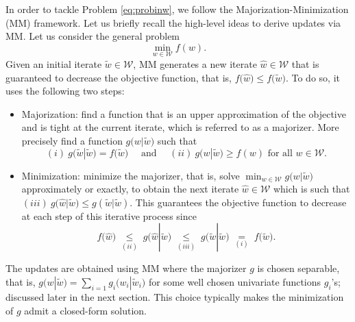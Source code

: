 \documentclass[a4paper, 11pt]{article}
\begin{document}
In order to tackle Problem \eqref{eq:probinw}, we follow the Majorization-Minimization (MM) framework. Let us briefly recall the high-level ideas to derive updates via MM.
Let us consider the general problem
\[
\min_{w \in \mathcal{W}} f(w). 
\] 
Given an initial iterate $\widetilde{w}\in \mathcal{W}$, MM generates a new iterate $\hat{w}\in \mathcal{W}$ that is guaranteed to decrease the objective function, that is,
$f\big( \hat{w} \big) \leq f\big( \widetilde{w}  \big)$. To do so, it uses the following two steps: 
\begin{itemize} 
\item Majorization: find a function that is an upper approximation of the objective and is tight at the current iterate, which is referred to as a majorizer. More precisely find a function $g\big(w|\widetilde{w}\big)$ such that 
\[
(i) ~ g\big(\widetilde{w}|\widetilde{w}\big) = f\big(\widetilde{w}\big) 
\quad \text{ and } \quad 
(ii)  ~  g\big({w}|\widetilde{w}\big) \geq f({w}) \text{ for all } w \in  \mathcal{W}. 
\]

\item Minimization: minimize the majorizer, that is, 
solve $\min_{w \in \mathcal{W}} g\big({w}|\widetilde{w}\big)$ approximately or exactly, to obtain the next iterate $\hat{w} \in \mathcal{W}$ which is such that $(iii) ~ g\big(\hat{w}|\widetilde{w}\big)  \leq g(\widetilde{w}|\widetilde{w})$. 
This guarantees the objective function to decrease at each step of this iterative process since 
\[
f\big(\hat{w}\big) 
\; 
\underset{(ii)}{\leq} 
\; 
g\big(\hat{w}|\widetilde{w}\big) 
\; 
\underset{(iii)}{\leq}  
\; 
g\big(\widetilde{w}|\widetilde{w}\big) 
\; 
\underset{(i)}{=} 
\; 
f\big(\widetilde{w}\big). 
\] 
\end{itemize}  
The updates are obtained using MM where the majorizer $g$ is chosen separable, that is, $g\big(w|\widetilde{w}\big) = \sum_{i=1} g_i\big(w_i|\widetilde{w}_i\big)$ for some well chosen univariate functions $g_i$'s; discussed later in the next section. 
This choice typically makes the minimization of $g$ admit a closed-form solution.
\end{document}
